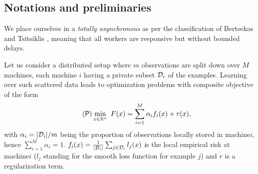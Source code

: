 \subsection{Notations and preliminaries}\label{sec:distributed-prelim}

We place ourselves in a \emph{totally asynchronous} as per the classification of Bertsekas and Tsitsiklis \cite[Chap.]{bertsekas1989parallel}, meaning that all workers are responsive but without bounded delays.

Let us consider a distributed setup where $m$ observations are split down over $M$ machines, each machine $i$ having a private subset $\mathcal{D}_i$ of the examples.
Learning over such scattered data leads to optimization problems with composite objective of the form
\begin{align}\label{eq:pb}
\tag{$\mathsf{P}$}
\min_{x\in\mathbb{R}^n}  ~ F(x) =  \sum_{i=1}^M  \alpha_i  f_i(x)  +  r(x),
\end{align}
with $\alpha_i= |\mathcal{D}_i|/m$ being the proportion of observations locally stored in machine\;$i$, hence $\sum_{i=1}^M\alpha_i = 1$. $f_i(x) = \frac{1}{|\mathcal{D}_i|}  \sum_{j\in\mathcal{D}_i}l_j(x) $ is the local empirical risk at machine\;$i$ ($l_j$ standing for the smooth loss function for example $j$) and $r$ is a regularization term.




